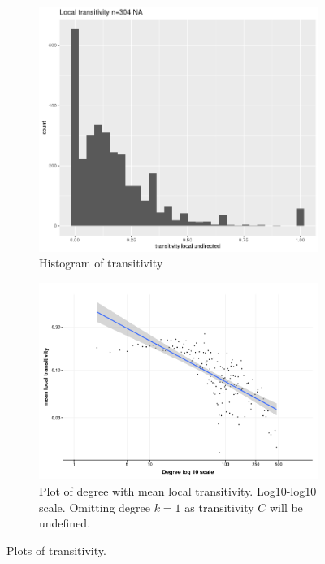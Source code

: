     
\begin{figure}
    \centering
    \begin{subfigure}[t]{0.45\textwidth}
        \centering
        \includegraphics[width=\linewidth]{images/Rplot_transitivity.png} 
        \caption{Histogram of transitivity} \label{fig:transitivity}
    \end{subfigure}
    \hfill
    \begin{subfigure}[t]{0.45\textwidth}
        \centering
        \includegraphics[width=\linewidth]{images/chapter3/ggplot2/c(k)/Rplot_C_k_new_formatted.png}
        \caption{Plot of degree with mean local transitivity. Log10-log10 scale. Omitting degree $k=1$ as transitivity $C$ will be undefined.}
        \label{fig:log_transitivity_degree}
    \end{subfigure}
    \caption{Plots of transitivity.}
\end{figure}


